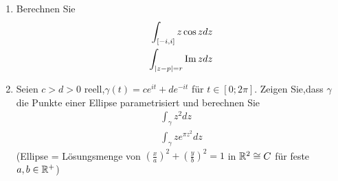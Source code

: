 \documentclass[ngerman]{report}
\begin{document}
\begin{question}\hspace{\linewidth}
    \begin{enumerate}
        \item Berechnen Sie
        \begin{align}
            \int_{[-i,i]} z\cos z dz\label{eq:2-1}\\
            \int_{\left|z-p\right|=r} \Im z dz \label{eq:2-2}
        \end{align}
    
        \item Seien $c>d>0$ reell,$\gamma(t)=ce^{it}+de^{-it}$ für $t\in [0;2\pi]$. Zeigen Sie,dass $\gamma$ die Punkte einer Ellipse parametrisiert und berechnen Sie
        \begin{align}
            \int_\gamma z^2 dz \label{eq:2-3} \\
            \int_\gamma z e^{\pi z^2} dz \label{eq:2-4}
        \end{align}
        (Ellipse = Lösungsmenge von $\left(\frac{x}{a}\right)^2 + \left(\frac{y}{b}\right)^2 =1$ in $\mathbb{R}^2 \cong C$ für feste $a,b\in\mathbb{R}^+$)
    \end{enumerate}
\end{question}
\end{document}
